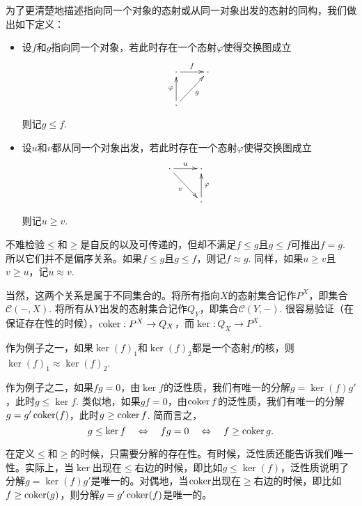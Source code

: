 \begin{para}

为了更清楚地描述指向同一个对象的态射或从同一对象出发的态射的同构，我们做出如下定义：

\begin{itemize}
\item 设$f$和$g$指向同一个对象，若此时存在一个态射$\varphi$使得交换图成立
\[
\begin{xy}
	\xymatrix{
	\cdot\ar[r]^-{f} &\cdot\\
	\cdot \ar[u]^{\varphi}\ar[ru]_{g}
	}
\end{xy}
\]
则记$g\leq f$. 

\item  设$u$和$v$都从同一个对象出发，若此时存在一个态射$\varphi$使得交换图成立
\[
\begin{xy}
	\xymatrix{
	\cdot \ar[r]^-{u}\ar[rd]_{v} &\cdot \\
	&\cdot \ar[u]_{\varphi}
	}
\end{xy}
\]
则记$u\geq v$. 
\end{itemize}

不难检验$\leq$和$\geq$是自反的以及可传递的，但却不满足$f\leq g$且$g\leq f$可推出$f=g$. 所以它们并不是偏序关系。如果$f\leq g$且$g\leq f$，则记$f\approx g$. 同样，如果$u\geq v$且$v\geq u$，记$u\approx v$.

当然，这两个关系是属于不同集合的。将所有指向$X$的态射集合记作$P^X$，即集合$\mathcal{C}(-,X)$. 将所有从$Y$出发的态射集合记作$Q_Y$，即集合$\mathcal{C}(Y,-)$. 很容易验证（在保证存在性的时候），$\operatorname{coker} : P^X \to Q_X$，而$\ker : Q_X\to P^X$.
\end{para}

作为例子之一，如果$\ker(f)_1$和$\ker(f)_2$都是一个态射$f$的核，则$\ker(f)_1\approx\ker(f)_2$. 

作为例子之二，如果$fg=0$，由$\ker f$的泛性质，我们有唯一的分解$g=\ker(f)g'$，此时$g\leq \ker f$. 类似地，如果$gf=0$，由$\operatorname{coker} f$的泛性质，我们有唯一的分解$g=g'\operatorname{coker}(f)$，此时$g\geq \operatorname{coker} f$. 简而言之，
\[
	g\leq \ker f \quad \Leftrightarrow \quad fg=0\quad  \Leftrightarrow \quad f\geq \operatorname{coker} g.
\]

\begin{para}
在定义$\leq$和$\geq$的时候，只需要分解的存在性。有时候，泛性质还能告诉我们唯一性。实际上，当$\ker$出现在$\leq$右边的时候，即比如$g\leq \ker(f)$，泛性质说明了分解$g=\ker(f)g'$是唯一的。对偶地，当$\operatorname{coker}$出现在$\geq$右边的时候，即比如$f\geq \operatorname{coker}(g)$，则分解$g=g'\operatorname{coker}(f)$是唯一的。
\end{para}

